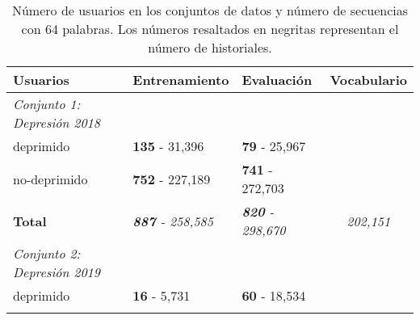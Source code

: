 \begin{table}[!hbt]
\caption{Número de usuarios en los conjuntos de datos y número de secuencias con 64 palabras. Los números resaltados en negritas representan el número de historiales.} \label{table:original_users}

\begin{center}

\begin{tabular}{llll}
\hline
\rowcolor[HTML]{FFFFFF} 
\textbf{Usuarios}                                           & \textbf{Entrenamiento}                       & \textbf{Evaluación}                          & \textbf{Vocabulario}                                         \\ \hline
\rowcolor[HTML]{EFEFEF} 
\textit{Conjunto 1: Depresión 2018}                         & \multicolumn{1}{c}{\cellcolor[HTML]{EFEFEF}} & \multicolumn{1}{c}{\cellcolor[HTML]{EFEFEF}} &                                                              \\ \hline
\rowcolor[HTML]{FFFFFF} 
deprimido                                                   & \textbf{135} - 31,396                                 & \textbf{79} - 25,967                                  &                                                              \\ \hline
\rowcolor[HTML]{FFFFFF} 
no-deprimido                                                & \textbf{752} - 227,189                                & \textbf{741} - 272,703                                &                                                              \\ \hline
\rowcolor[HTML]{FFFFFF} 
\textbf{Total}                                              & \textit{\textbf{887} - 258,585}                       & \textit{\textbf{820} - 298,670}                       & \multicolumn{1}{c}{\cellcolor[HTML]{FFFFFF}\textit{202,151}} \\ \hline
\rowcolor[HTML]{EFEFEF} 
\cellcolor[HTML]{EFEFEF}\textit{Conjunto 2: Depresión 2019} &                                              &                                              &                                                              \\ \hline
\rowcolor[HTML]{FFFFFF} 
deprimido                                                   & \textbf{16} - 5,731                                   & \textbf{60} - 18,534                                  &                                                              \\ \hline
\rowcolor[HTML]{FFFFFF} 

\end{tabular}
\end{center}
\end{table}
